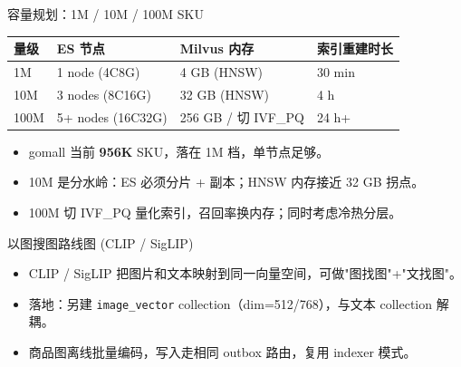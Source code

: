 \documentclass[aspectratio=169,11pt]{beamer}
\begin{document}
\begin{frame}[shrink]{容量规划：1M / 10M / 100M SKU}
\begin{tabular}{@{}llll@{}}
\toprule
量级    & ES 节点         & Milvus 内存        & 索引重建时长   \\
\midrule
1M     & 1 node (4C8G)  & 4 GB (HNSW)        & 30 min        \\
10M    & 3 nodes (8C16G) & 32 GB (HNSW)      & 4 h           \\
100M   & 5+ nodes (16C32G) & 256 GB / 切 IVF\_PQ & 24 h+         \\
\bottomrule
\end{tabular}
\vspace{2mm}
\begin{itemize}
  \item gomall 当前 \textbf{956K} SKU，落在 1M 档，单节点足够。
  \item 10M 是分水岭：ES 必须分片 + 副本；HNSW 内存接近 32 GB 拐点。
  \item 100M 切 IVF\_PQ 量化索引，召回率换内存；同时考虑冷热分层。
\end{itemize}
\end{frame}

\begin{frame}[shrink]{以图搜图路线图 (CLIP / SigLIP)}
\vspace{2mm}
\begin{itemize}
  \item CLIP / SigLIP 把图片和文本映射到同一向量空间，可做"图找图"+"文找图"。
  \item 落地：另建 \texttt{image\_vector} collection（dim=512/768），与文本 collection 解耦。
  \item 商品图离线批量编码，写入走相同 outbox 路由，复用 indexer 模式。
\end{itemize}
\end{frame}
\end{document}

